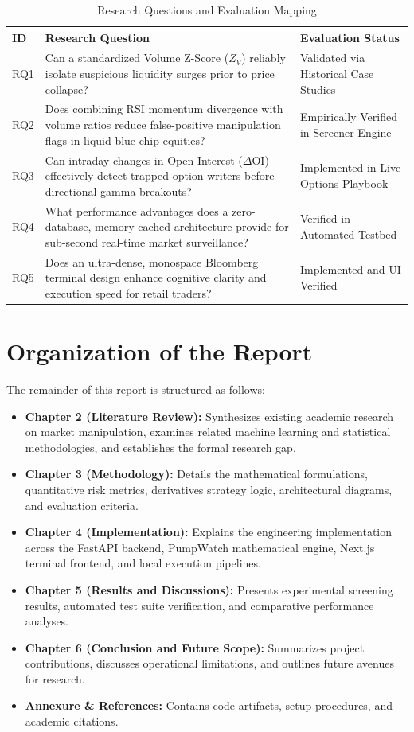 \begin{table}[H]
\centering
\caption{Research Questions and Evaluation Mapping}
\label{tab:rq_mapping}
\begin{tabularx}{\textwidth}{@{}lXl@{}}
\toprule
\textbf{ID} & \textbf{Research Question} & \textbf{Evaluation Status} \\
\midrule
RQ1 & Can a standardized Volume Z-Score ($Z_V$) reliably isolate suspicious liquidity surges prior to price collapse? & Validated via Historical Case Studies \\
RQ2 & Does combining RSI momentum divergence with volume ratios reduce false-positive manipulation flags in liquid blue-chip equities? & Empirically Verified in Screener Engine \\
RQ3 & Can intraday changes in Open Interest ($\Delta\text{OI}$) effectively detect trapped option writers before directional gamma breakouts? & Implemented in Live Options Playbook \\
RQ4 & What performance advantages does a zero-database, memory-cached architecture provide for sub-second real-time market surveillance? & Verified in Automated Testbed \\
RQ5 & Does an ultra-dense, monospace Bloomberg terminal design enhance cognitive clarity and execution speed for retail traders? & Implemented and UI Verified \\
\bottomrule
\end{tabularx}
\end{table}

\section{Organization of the Report}
The remainder of this report is structured as follows:
\begin{itemize}
    \item \textbf{Chapter 2 (Literature Review):} Synthesizes existing academic research on market manipulation, examines related machine learning and statistical methodologies, and establishes the formal research gap.
    \item \textbf{Chapter 3 (Methodology):} Details the mathematical formulations, quantitative risk metrics, derivatives strategy logic, architectural diagrams, and evaluation criteria.
    \item \textbf{Chapter 4 (Implementation):} Explains the engineering implementation across the FastAPI backend, PumpWatch mathematical engine, Next.js terminal frontend, and local execution pipelines.
    \item \textbf{Chapter 5 (Results and Discussions):} Presents experimental screening results, automated test suite verification, and comparative performance analyses.
    \item \textbf{Chapter 6 (Conclusion and Future Scope):} Summarizes project contributions, discusses operational limitations, and outlines future avenues for research.
    \item \textbf{Annexure \& References:} Contains code artifacts, setup procedures, and academic citations.
\end{itemize}
